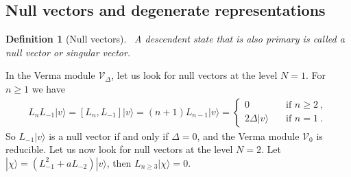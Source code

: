 \documentclass[12pt, a4paper]{article}
\theoremstyle{break}
\newtheorem{defn}[exo]{Definition}
\begin{document}
\subsection{Null vectors and degenerate representations}\label{sec:nv}

\begin{defn}[Null vectors]
 ~\label{def:nv}
 A descendent state that is also primary is called a null vector or singular vector.
\end{defn}
In the Verma module $\mathcal V_\Delta$, let us look for null vectors at the level $N=1$. For $n\geq 1$ we have 
\begin{align}
L_n L_{-1}|v\rangle = [L_n, L_{-1}] |v\rangle = (n+1) L_{n-1}|v\rangle = 
\left\{\begin{array}{ll} 0 &  \quad \text{if } n\geq 2\ , \\ 2\Delta |v\rangle & \quad \text{if } n = 1\ . \end{array}\right. 
\end{align}
So $L_{-1}|v\rangle$ is a null vector if and only if $\Delta=0$, and the Verma module $\mathcal V_0$ is reducible.
Let us now look for null vectors at the level $N=2$. Let $|\chi\rangle = (L_{-1}^2 + a L_{-2})|v\rangle$, then $L_{n\geq 3} |\chi \rangle =0$. 
\end{document}
